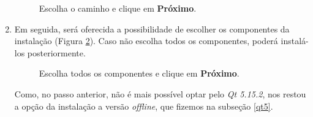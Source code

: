 \documentclass[a4paper,11pt]{article}
\newcommand{\qtfive}{\textit{Qt 5.15.2}}
\begin{document}
\begin{enumerate}
\begin{figure}[H]
	\centering
	\caption{ Escolha o caminho e clique em \textbf{Próximo}.}
	\label{fig:qt_download_path}
\end{figure}

\item Em seguida, será oferecida a possibilidade de escolher os componentes da instalação (Figura \ref{fig:qt_inst_modules}). Caso não escolha todos os componentes, poderá instalá-los posteriormente.

\begin{figure}[H]
	\centering
	\caption{ Escolha todos os componentes e clique em \textbf{Próximo}.}
	\label{fig:qt_inst_modules}
\end{figure}

Como, no passo anterior, não é mais possível optar pelo \qtfive{}, nos restou a opção da instalação a versão \textit{offline}, que fizemos na subseção \ref{qt5}.


\end{enumerate}
\end{document}
